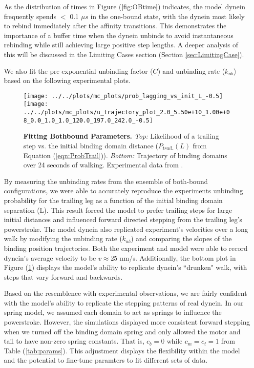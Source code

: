 As the distribution of times in Figure (\ref{fig:OBtime}) indicates, the model dynein frequently spends $<$ 0.1 $\mu s$ in the one-bound state, with the dynein most likely to rebind immediately after the affinity transitions. This demonstrates the importance of a buffer time when the dynein unbinds to avoid instantaneous rebinding while still achieving large positive step lengths. A deeper analysis of this will be discussed in the Limiting Cases section (Section \ref{sec:LimitingCase}).

We also fit the pre-exponential unbinding factor ($C$) and unbinding rate ($k_{ub}$) based on the following experimental plots.

\begin{figure}[H]
	\centering
	\texttt{[image: ../../plots/mc\_plots/prob\_lagging\_vs\_init\_L\_-0.5]}
	\texttt{[image: ../../plots/mc\_plots/u\_trajectory\_plot\_2.0\_5.50e+10\_1.00e+08\_0.0\_1.0\_1.0\_120.0\_197.0\_242.0\_-0.5]}
	\caption[Fitting Bothbound Parameters]{\textbf{Fitting Bothbound Parameters.} \textit{Top: }Likelihood of a trailing step vs. the initial binding domain distance ($P_{trail.}(L)$ from Equation (\ref{eqn:ProbTrail})). \textit{Bottom: }Trajectory of binding domains over 24 seconds of walking. Experimental data from \cite{Dewitt2012}.}
	\label{fig:BBPlots}
\end{figure}

By measuring the unbinding rates from the ensemble of both-bound configurations, we were able to accurately reproduce the experiments unbinding probability for the trailing leg as a function of the initial binding domain separation (L). This result forced the model to prefer trailing steps for large initial distances and influenced forward directed stepping from the trailing leg's powerstroke. The model dynein also replicated experiment's velocities over a long walk by modifying the unbinding rate ($k_{ub}$) and comparing the slopes of the binding position trajectories. Both the experiment and model were able to record dynein's average velocity to be $v\approx25$ nm/s. Additionally, the bottom plot in Figure (\ref{fig:BBPlots}) displays the model's ability to replicate dynein's ``drunken" walk, with steps that vary forward and backwards. 

Based on the resemblence with experimental observations, we are fairly confident with the model's ability to replicate the stepping patterns of real dynein. In our spring model, we assumed each domain to act as springs to influence the powerstroke. However, the simulations displayed more consistent forward stepping when we turned off the binding domain spring and only allowed the motor and tail to have non-zero spring constants. That is, $c_b=0$ while $c_m=c_t=1$ from Table (\ref{tab:params}). This adjustment displays the flexibility within the model and the potential to fine-tune paramters to fit different sets of data. 

